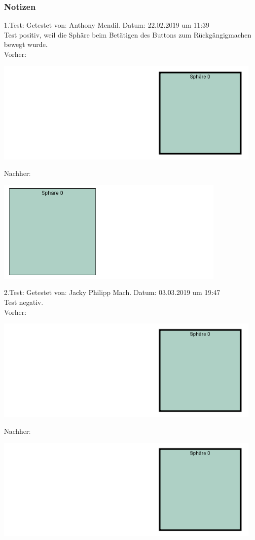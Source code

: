 \documentclass[enabledeprecatedfontcommands]{scrartcl}
\begin{document}
\subsubsection{Notizen}
1.Test: Getestet von: Anthony Mendil. Datum: 22.02.2019 um 11:39 \\
Test positiv, weil die Sphäre beim Betätigen des Buttons zum Rückgängigmachen bewegt wurde. \\
Vorher: 
\begin{center}
\includegraphics[height=5cm]{2_1vorher.PNG}
\end{center}
Nachher: 
\begin{center}
\includegraphics[height=5cm]{2_1nachher.PNG}
\end{center}
2.Test: Getestet von: Jacky Philipp Mach. Datum: 03.03.2019 um 19:47 \\
Test negativ. \\
Vorher: 
\begin{center}
\includegraphics[height=5cm]{2_1vorher.PNG}
\end{center}
Nachher: 
\begin{center}
\includegraphics[height=5cm]{2_1vorher.PNG}
\end{center}
\end{document}
